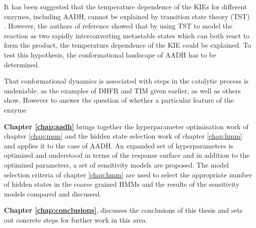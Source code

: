 It has been suggested that the temperature dependence of the KIEs for different enzymes, including AADH, cannot be explained by transition state theory (TST) \cite{agrawalVibrationallyEnhancedHydrogen2004,kohenEnzymeCatalysisClassical1998}. However, the authors of reference \cite{glowackiProteinDynamicsEnzyme2012a} showed that by using TST to model the reaction as two rapidly interconverting metastable states which can both react to form the product, the temperature dependence of the KIE could be explained. To test this hypothesis, the conformational landscape of AADH has to be determined. 

That conformational dynamics is associated with steps in the catalytic process is undeniable, as the examples of DHFR and TIM given earlier, as well as others \cite{hammesMultipleConformationalChanges2002, hammes-schifferRelatingProteinMotion2006a} show.  However to answer the question of whether a particular feature of the enzyme 


\textbf{Chapter \ref{chap:aadh}} brings together the hyperparameter optimisation work of chapter  \ref{chap:msm} and the hidden state selection work of chapter \ref{chap:hmm} and applies it to the case of AADH. An expanded set of hyperparameters is optimised and understood in terms of the response surface and in addition to the optimized parameters, a set of sensitivity models are proposed. The model selection criteria of chapter \ref{chap:hmm} are used to select the appropriate number of hidden states in the coarse grained HMMs and the results of the sensitivity models compared and discussed. 

\textbf{Chapter \ref{chap:conclusions}}, discusses the conclusions of this thesis and sets out concrete steps for further work in this area. 













